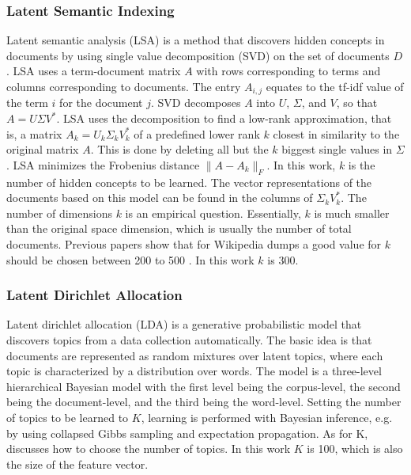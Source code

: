 \documentclass[a4paper]{article}
\begin{document}
\subsubsection{Latent Semantic Indexing}
Latent semantic analysis (LSA) \cite{deerwester1990indexing} is a method that discovers hidden concepts in documents by using single value decomposition (SVD) on the set of documents $D$.
LSA uses a term-document matrix $A$ with rows corresponding to terms and columns corresponding to documents. The entry $A_{i,j}$ equates to the tf-idf value of the term $i$ for the document $j$. SVD decomposes $A$ into $U$, $\Sigma$, and $V$, so that $A = U \Sigma V^*$.
LSA uses the decomposition to find a low-rank approximation, that is, a matrix $A_k = U_k \Sigma_k V_k^*$ of a predefined lower rank $k$ closest in similarity to the original matrix $A$. This is done by deleting all but the $k$ biggest single values in $\Sigma$.
LSA minimizes the Frobenius distance $\|A-A_k\|_F$. In this work, $k$ is the number of hidden concepts to be learned. The vector representations of the documents based on this model can be found in the columns of $\Sigma_k V_k^*$.
The number of dimensions $k$ is an empirical question. Essentially, $k$ is much smaller than the original space dimension, which is usually the number of total documents. Previous papers show that for Wikipedia dumps a good value for $k$ should be chosen between 200 to 500 \cite{bradford2008empirical}. In this work $k$ is 300.


\subsubsection{Latent Dirichlet Allocation}
Latent dirichlet allocation (LDA) \cite{blei2003latent} is a generative probabilistic model that  discovers topics from a data collection automatically.
The basic idea is that documents are represented as random mixtures over latent topics, where each topic is characterized by a distribution over words. The model is a three-level hierarchical Bayesian model with the first level being the corpus-level, the second being the document-level, and the third being the word-level. Setting the number of topics to be learned to $K$, learning is performed with Bayesian inference, e.g. by using collapsed Gibbs sampling and expectation propagation. As for K, \cite{hoffman2010online} discusses how to choose the number of topics. In this work $K$ is 100, which is also the size of the feature vector.
\end{document}
